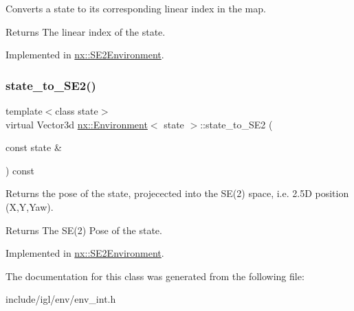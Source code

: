 Converts a state to its corresponding linear index in the map. \begin{DoxyReturn}{Returns}
The linear index of the state. 
\end{DoxyReturn}


Implemented in \hyperlink{classnx_1_1SE2Environment_a0fe7c5f438795a98f17be0ed95b2ff7c}{nx\+::\+S\+E2\+Environment}.

\mbox{\label{classnx_1_1Environment_ae31bd7f19efac45fc07d405f1fcfd2b2}} 
\subsubsection{\texorpdfstring{state\+\_\+to\+\_\+\+S\+E2()}{state\_to\_SE2()}}
{\footnotesize\ttfamily template$<$class state$>$ \\
virtual Vector3d \hyperlink{classnx_1_1Environment}{nx\+::\+Environment}$<$ state $>$\+::state\+\_\+to\+\_\+\+S\+E2 (\begin{DoxyParamCaption}\item[{const state \&}]{ }\end{DoxyParamCaption}) const\hspace{0.3cm}{\ttfamily [pure virtual]}}

Returns the pose of the state, projecected into the S\+E(2) space, i.\+e. 2.\+5D position (X,Y,Yaw). \begin{DoxyReturn}{Returns}
The S\+E(2) Pose of the state. 
\end{DoxyReturn}


Implemented in \hyperlink{classnx_1_1SE2Environment_ab1f9056e6fffe905ec225ee3885679b4}{nx\+::\+S\+E2\+Environment}.



The documentation for this class was generated from the following file\+:\begin{DoxyCompactItemize}
\item 
include/igl/env/env\+\_\+int.\+h\end{DoxyCompactItemize}

